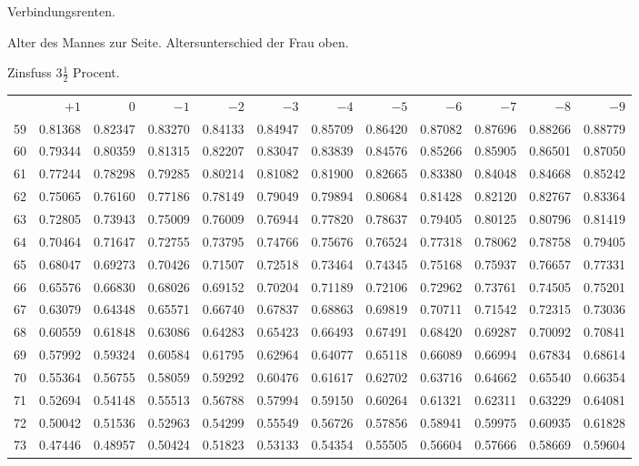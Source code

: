 \clearpage
{}
\begin{center}
Verbindungsrenten.\par\smallskip
Alter des Mannes zur Seite. Altersunterschied der Frau oben.\par\smallskip
Zinsfuss \(3\tfrac{1}{2}\) Procent.\par\medskip
\fontsize{8}{10}\selectfont\setlength{\tabcolsep}{1.3pt}
\begin{tabular}{|r|rrrrrrrrrrr|}
\hline
&\(+1\)&0&\(-1\)&\(-2\)&\(-3\)&\(-4\)&\(-5\)&\(-6\)&\(-7\)&\(-8\)&\(-9\)\\[8pt]
59&0.81368&0.82347&0.83270&0.84133&0.84947&0.85709&0.86420&0.87082&0.87696&0.88266&0.88779\\
60&0.79344&0.80359&0.81315&0.82207&0.83047&0.83839&0.84576&0.85266&0.85905&0.86501&0.87050\\
61&0.77244&0.78298&0.79285&0.80214&0.81082&0.81900&0.82665&0.83380&0.84048&0.84668&0.85242\\
62&0.75065&0.76160&0.77186&0.78149&0.79049&0.79894&0.80684&0.81428&0.82120&0.82767&0.83364\\
63&0.72805&0.73943&0.75009&0.76009&0.76944&0.77820&0.78637&0.79405&0.80125&0.80796&0.81419\\
64&0.70464&0.71647&0.72755&0.73795&0.74766&0.75676&0.76524&0.77318&0.78062&0.78758&0.79405\\[5pt]
65&0.68047&0.69273&0.70426&0.71507&0.72518&0.73464&0.74345&0.75168&0.75937&0.76657&0.77331\\
66&0.65576&0.66830&0.68026&0.69152&0.70204&0.71189&0.72106&0.72962&0.73761&0.74505&0.75201\\
67&0.63079&0.64348&0.65571&0.66740&0.67837&0.68863&0.69819&0.70711&0.71542&0.72315&0.73036\\
68&0.60559&0.61848&0.63086&0.64283&0.65423&0.66493&0.67491&0.68420&0.69287&0.70092&0.70841\\
69&0.57992&0.59324&0.60584&0.61795&0.62964&0.64077&0.65118&0.66089&0.66994&0.67834&0.68614\\[5pt]
70&0.55364&0.56755&0.58059&0.59292&0.60476&0.61617&0.62702&0.63716&0.64662&0.65540&0.66354\\
71&0.52694&0.54148&0.55513&0.56788&0.57994&0.59150&0.60264&0.61321&0.62311&0.63229&0.64081\\
72&0.50042&0.51536&0.52963&0.54299&0.55549&0.56726&0.57856&0.58941&0.59975&0.60935&0.61828\\
73&0.47446&0.48957&0.50424&0.51823&0.53133&0.54354&0.55505&0.56604&0.57666&0.58669&0.59604\\

\end{tabular}
\end{center}
